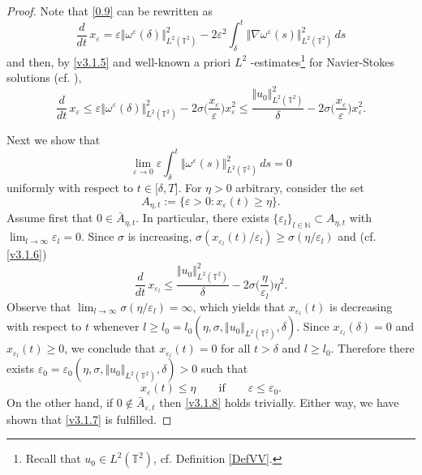 \documentclass[11pt, a4paper,leqno]{amsart}
\theoremstyle{plain}
\numberwithin{equation}{section}
\theoremstyle{definition}
\theoremstyle{remark}
\def\T{\mathbb{T}}
\begin{document}
\begin{proof}
Note that \eqref{0.9} can be rewritten as
\[
\frac{d}{dt}\,x_{\varepsilon}=\varepsilon\Vert\omega^{\varepsilon}(\delta)\Vert_{L^{2}(\T^2)}^{2}-2\varepsilon
^{2}\int_{\delta}^{t}\Vert\nabla\omega^{\varepsilon}(s)\Vert_{L^{2}(\T^2)}^{2}\,ds
\]
and then, by \eqref{v3.1.5} and well-known a priori $L^{2}$%
-estimates\footnote{Recall that $u_{0}\in L^{2}(\T^2)$, cf. Definition \ref{DefVV}.} for Navier-Stokes solutions (cf. \cite[Lemma A.2]{Lan}),
\begin{equation}
\frac{d}{dt}\,x_{\varepsilon}\leq\varepsilon\Vert\omega^{\varepsilon}(\delta)\Vert_{L^{2}(\T^2)}^{2}%
-2\sigma\Big(\frac{x_{\varepsilon}}{\varepsilon}\Big)x_{\varepsilon}^{2}\leq\frac{\Vert u_{0}%
\Vert_{L^{2}(\T^2)}^{2}}{\delta}-2\sigma\Big(\frac{x_{\varepsilon}}{\varepsilon}\Big)x_{\varepsilon}^{2}.
\label{v3.1.6}%
\end{equation}


Next we show that
\begin{equation}
\lim_{\varepsilon\rightarrow0}\varepsilon\int_{\delta}^{t}\Vert\omega^{\varepsilon}(s)\Vert_{L^{2}(\T^2)%
}^{2}\,ds=0 \label{v3.1.7}%
\end{equation}
uniformly with respect to $t\in\lbrack\delta,T]$. For $\eta>0$ arbitrary,
consider the set
\[
A_{\eta,t}:=\{\varepsilon>0:x_{\varepsilon}(t)\geq\eta\}.
\]
Assume first that $0\in\bar{A}_{\eta,t}$. In particular, there exists
$\{\varepsilon_{l}\}_{l\in\mathbb{N}}\subset A_{\eta,t}$ with $\lim_{l\rightarrow
\infty}\varepsilon_{l}=0$. Since $\sigma$ is increasing, $\sigma(x_{\varepsilon_{l}}%
(t)/\varepsilon_{l})\geq\sigma(\eta/\varepsilon_{l})$ and (cf. \eqref{v3.1.6})
\[
\frac{d}{dt}\,x_{\varepsilon_{l}}\leq\frac{\Vert u_{0}\Vert_{L^{2}(\T^2)}^{2}}{\delta
}-2\sigma\Big(\frac{\eta}{\varepsilon_{l}}\Big)\eta^{2}.
\]
Observe that $\lim_{l\rightarrow\infty}\sigma(\eta/\varepsilon_{l})=\infty$,
which yields that $x_{\varepsilon_{l}}(t)$ is decreasing with respect to $t$ whenever
$l\geq l_{0}=l_{0}(\eta,\sigma,\Vert u_{0}\Vert_{L^{2}(\T^2)},\delta)$. Since
$x_{\varepsilon_{l}}(\delta)=0$ and $x_{\varepsilon_{l}}(t)\geq0$, we conclude that
$x_{\varepsilon_{l}}(t)=0$ for all $t>\delta$ and $l\geq l_{0}$. Therefore there
exists $\varepsilon_{0}=\varepsilon_{0}(\eta,\sigma,\Vert u_{0}\Vert_{L^{2}(\T^2)},\delta)>0$
such that
\begin{equation}
x_{\varepsilon}(t)\leq\eta \qquad\text{if}\qquad\varepsilon\leq\varepsilon_{0}. \label{v3.1.8}%
\end{equation}
On the other hand, if $0\not \in \bar{A}_{\varepsilon,t}$ then \eqref{v3.1.8}
holds trivially. Either way, we have shown that \eqref{v3.1.7} is fulfilled.


\end{proof}
\end{document}
